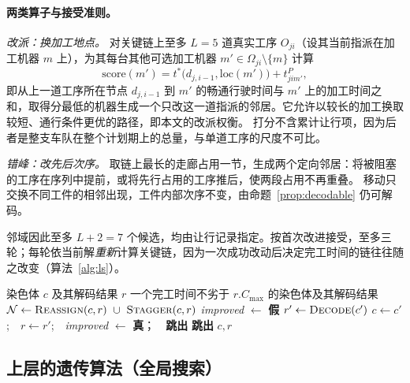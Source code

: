 \documentclass[manuscript,screen,review]{acmart}
\begin{document}
\paragraph{两类算子与接受准则。}
\emph{改派：换加工地点。} 对关键链上至多 $L=5$ 道真实工序 $O_{ji}$（设其当前指派在加工机器 $m$ 上），为其每台其他可选加工机器
$m'\in\Omega_{ji}\setminus\{m\}$ 计算
\begin{equation}
\label{eq:reassign}
\mathrm{score}(m')=t^{*}\bigl(d_{j,i-1},\mathrm{loc}(m')\bigr)
+t^{P}_{jim'},
\end{equation}
即从上一道工序所在节点 $d_{j,i-1}$ 到 $m'$ 的畅通行驶时间与 $m'$ 上的加工时间之和，取得分最低的机器生成一个只改这一道指派的邻居。它允许以较长的加工换取较短、通行条件更优的路径，即本文的改派权衡。
打分不含累计让行项，因为后者是整支车队在整个计划期上的总量，与单道工序的尺度不可比。

\emph{错峰：改先后次序。} 取链上最长的走廊占用一节，生成两个定向邻居：将被阻塞的工序在序列中提前，或将先行占用的工序推后，使两段占用不再重叠。
移动只交换不同工件的相邻出现，工件内部次序不变，由命题~\ref{prop:decodable} 仍可解码。

邻域因此至多 $L+2=7$ 个候选，均由让行记录指定。按首次改进接受，至多三轮；每轮依当前解\emph{重新}计算关键链，因为一次成功改动后决定完工时间的链往往随之改变（算法~\ref{alg:ls}）。

\begin{algorithm}[t]
\caption{\textsc{ContentionGuidedSearch}：按让行记录的局部搜索}
\label{alg:ls}
\small
\begin{algorithmic}[1]
\Require 染色体 $c$ 及其解码结果 $r$
\Ensure 一个完工时间不劣于 $r.C_{\max}$ 的染色体及其解码结果
  \State $\mathcal{N}\gets\textsc{Reassign}(c,r)\ \cup\ \textsc{Stagger}(c,r)$
  \State \textit{improved} $\gets$ \textbf{假}
    \State $r'\gets\textsc{Decode}(c')$
      \State $c\gets c'$;\ \ $r\gets r'$;\ \ \textit{improved} $\gets$
             \textbf{真}；\ \ \textbf{跳出}
    \EndIf
  \EndFor
   \State \textbf{跳出} \EndIf
\EndFor
\State \Return $c,r$
\end{algorithmic}
\end{algorithm}

\subsection{上层的遗传算法（全局搜索）}
\label{sec:ga}
\end{document}
